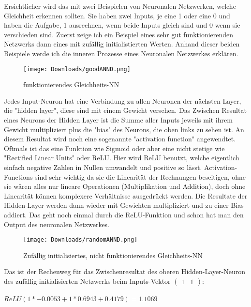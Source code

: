 \documentclass[10pt,a4paper,ngerman,english]{article}
\begin{document}
Ersichtlicher wird das mit zwei Beispielen von Neuronalen Netzwerken, welche Gleichheit erkennen sollten. Sie haben zwei Inputs, je eine 1 oder eine 0 und haben die Aufgabe, 1 ausrechnen, wenn beide Inputs gleich sind und 0 wenn sie verschieden sind. Zuerst zeige ich ein Beispiel eines sehr gut funktionierenden Netzwerks dann eines mit zufällig initialistierten Werten. Anhand dieser beiden Beispiele werde ich die inneren Prozesse eines Neuronalen Netzwerkes erklären. 

\begin{figure}[h]
    \begin{center}
        \texttt{[image: Downloads/goodANND.png]}
        \caption{funktionierendes Gleichheits-NN}
    \end{center}
\end{figure}

Jedes Input-Neuron hat eine Verbindung zu allen Neuronen der nächsten Layer, die "hidden layer", diese sind mit einem Gewicht versehen. Das Zwischen Resultat eines Neurons der Hidden Layer ist die Summe aller Inputs jeweils mit ihrem Gewicht multipliziert plus die "bias" des Neurons, die oben links zu sehen ist. An diesem Resultat wird noch eine sogenannte "activation function" angewendtet. Oftmals ist das eine Funktion wie Sigmoid oder aber eine nicht stetige wie "Rectified Linear Units" oder ReLU. Hier wird ReLU benutzt, welche eigentlich einfach negative Zahlen in Nullen umwandelt und positive so lässt. Activation-Functions sind sehr wichtig da sie die Linearität der Rechnungen beseitigen, ohne sie wären alles nur lineare Operationen (Multiplikation und Addition), doch ohne Linearität können komplexere Verhältnisse ausgedrückt werden. Die Resultate der Hidden-Layer werden dann wieder mit Gewichten multipliziert und zu einer Bias addiert. Das geht noch einmal durch die ReLU-Funktion und schon hat man den Output des neuronalen Netzwerkes.

\begin{figure}[h]
    \begin{center}
        \texttt{[image: Downloads/randomANND.png]}
    \caption{Zufällig initialisiertes, nicht funktionierendes Gleichheits-NN}
    \end{center}    
\end{figure}



Das ist der Rechenweg für das Zwischenresultat des oberen Hidden-Layer-Neuron 
des zufällig initialisierten Netzwerks beim Inputs-Vektor
$ \left(\begin{array}{cc} 1 & 1\end{array}\right) $:\\
\\
$ ReLU(1 * -0.0053 + 1 * 0.6943 + 0.4179) = 1.1069 $\\
\end{document}
